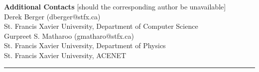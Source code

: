 \documentclass[10pt,letter]{article}
\begin{document}
\small
\noindent
\textbf{Additional Contacts} [should the corresponding author be unavailable]\\
Derek Berger (dberger@stfx.ca)\\
\footnotesize
\hspace*{0.25cm} St. Francis Xavier University, Department of Computer Science \\
\small
Gurpreet S. Matharoo (gmatharo@stfx.ca) \\
\footnotesize
\hspace*{0.25cm} St. Francis Xavier University, Department of Physics \\
\hspace*{0.25cm} St. Francis Xavier University, ACENET
\normalsize






% 

\footnotesize
\begin{center}
\noindent\rule{6cm}{0.4pt}
\end{center}

\AtNextBibliography{\footnotesize}
\printbibliography[heading=none]
\end{document}
